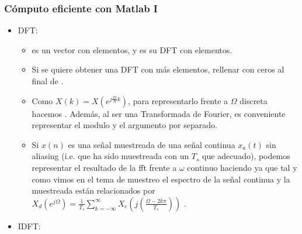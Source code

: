 \begin{frame}
\frametitle{Cómputo eficiente  con Matlab I}

\footnotesize
\begin{itemize}

\item DFT:   
\begin{itemize}
\footnotesize
\item {} \color{black} es un vector con  \color{black} elementos, y  \color{black} es su DFT con  \color{black}  elementos.
\item Si se quiere obtener una DFT con más elementos, rellenar con ceros al final de \color{black}.
\item Como $X(k)=X(e^{j \frac{2\pi}{N}k})$, para representarlo frente a $\Omega$ discreta hacemos \color{black}. Además, al ser una Transformada de Fourier, es conveniente representar el modulo y el argumento por separado.

\item Si $x(n)$ es una señal muestreada de una señal continua $x_a(t)$ sin aliasing (i.e. que ha sido muestreada con un $T_s$ que adecuado), podemos representar el resultado de la fft  frente a $\omega$ continuo haciendo   \color{black}\color{black} ya que tal y como vimos en el tema de muestreo el espectro de la señal continua y la muestreada están relacionados por $X_d(e^{j\Omega})=\frac{1}{T_s}\!\! \sum_{k=-\infty}^{\infty}\!X_c(j(\frac{\Omega-2k\pi}{T_s}))$ .

\end{itemize}

\item \color{black}IDFT: 

\end{itemize}

\end{frame}



